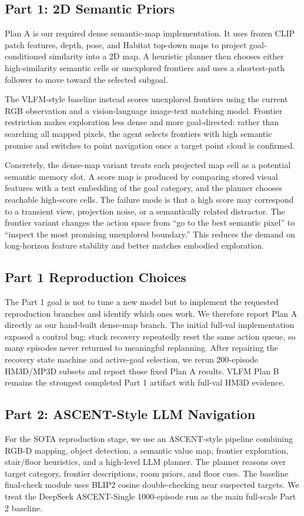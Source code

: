 \documentclass[10pt,twocolumn,letterpaper]{article}
\begin{document}
\subsection{Part 1: 2D Semantic Priors}
Plan A is our required dense semantic-map implementation. It uses frozen CLIP patch features, depth, pose, and Habitat top-down maps to project goal-conditioned similarity into a 2D map. A heuristic planner then chooses either high-similarity semantic cells or unexplored frontiers and uses a shortest-path follower to move toward the selected subgoal.

The VLFM-style baseline instead scores unexplored frontiers using the current RGB observation and a vision-language image-text matching model. Frontier restriction makes exploration less dense and more goal-directed: rather than searching all mapped pixels, the agent selects frontiers with high semantic promise and switches to point navigation once a target point cloud is confirmed.

Concretely, the dense-map variant treats each projected map cell as a potential semantic memory slot. A score map is produced by comparing stored visual features with a text embedding of the goal category, and the planner chooses reachable high-score cells. The failure mode is that a high score may correspond to a transient view, projection noise, or a semantically related distractor. The frontier variant changes the action space from ``go to the best semantic pixel'' to ``inspect the most promising unexplored boundary.'' This reduces the demand on long-horizon feature stability and better matches embodied exploration.

\subsection{Part 1 Reproduction Choices}
The Part 1 goal is not to tune a new model but to implement the requested reproduction branches and identify which ones work. We therefore report Plan A directly as our hand-built dense-map branch. The initial full-val implementation exposed a control bug: stuck recovery repeatedly reset the same action queue, so many episodes never returned to meaningful replanning. After repairing the recovery state machine and active-goal selection, we rerun 200-episode HM3D/MP3D subsets and report those fixed Plan A results. VLFM Plan B remains the strongest completed Part 1 artifact with full-val HM3D evidence.

\subsection{Part 2: ASCENT-Style LLM Navigation}
For the SOTA reproduction stage, we use an ASCENT-style pipeline combining RGB-D mapping, object detection, a semantic value map, frontier exploration, stair/floor heuristics, and a high-level LLM planner. The planner reasons over target category, frontier descriptions, room priors, and floor cues. The baseline final-check module uses BLIP2 cosine double-checking near suspected targets. We treat the DeepSeek ASCENT-Single 1000-episode run as the main full-scale Part 2 baseline.
\end{document}
